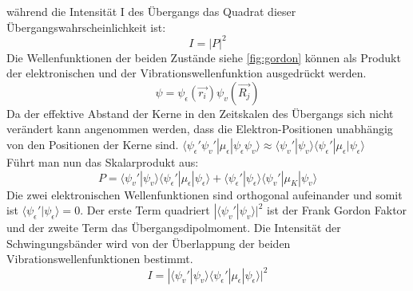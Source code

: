 während die Intensität I des Übergangs das Quadrat dieser Übergangswahrscheinlichkeit ist: 
\begin{equation}
    I = |P|^2
\end{equation}
Die Wellenfunktionen der beiden Zustände siehe \ref{fig:gordon} können als Produkt der elektronischen und der Vibrationswellenfunktion ausgedrückt werden.
\begin{equation}
    \psi = \psi_{\epsilon}(\vec{r_i}) \psi_v(\vec{R_j})
\end{equation} 
Da der effektive Abstand der Kerne in den Zeitskalen des Übergangs sich nicht verändert kann angenommen werden, dass die Elektron-Positionen unabhängig von den Positionen der Kerne sind.
$\langle \psi_{\epsilon}' \psi_v' | \mu_{\epsilon}| \psi_{\epsilon} \psi_v\rangle  \approx  \langle\psi_v' |\psi_v \rangle \langle\psi_{\epsilon}'|\mu_{\epsilon}| \psi_{\epsilon} \rangle $ \\
Führt man nun das Skalarprodukt aus:
\begin{equation}
    P = \langle \psi_v' | \psi_v \rangle \langle \psi_{\epsilon}' | \mu_{\epsilon} | \psi_{\epsilon} \rangle + \langle \psi_{\epsilon}' | \psi_{\epsilon} \rangle \langle\psi_v' | \mu_K |\psi_v \rangle
\end{equation}
Die zwei elektronischen Wellenfunktionen sind orthogonal aufeinander und somit ist $\langle \psi_{\epsilon}' | \psi_{\epsilon} \rangle  = 0$.
Der erste Term quadriert $|\langle \psi_v' | \psi_v \rangle|^2$ ist der Frank Gordon Faktor und der zweite Term das Übergangsdipolmoment. 
Die Intensität der Schwingungsbänder wird von der Überlappung der beiden Vibrationswellenfunktionen bestimmt.
\begin{equation}
    I = |\langle \psi_v' | \psi_v \rangle \langle \psi_{\epsilon}' | \mu_{\epsilon} | \psi_{\epsilon} \rangle|^2
\end{equation}


\label{q:26}


